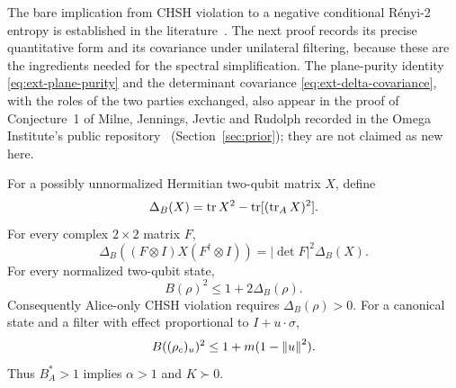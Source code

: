 The bare implication from CHSH violation to a negative conditional
R\'enyi-2 entropy is established in the literature~\cite{horodecki1996}.
The next proof records its precise quantitative form and its covariance
under unilateral filtering, because these are the ingredients needed for
the spectral simplification. The plane-purity identity
\eqref{eq:ext-plane-purity} and the determinant covariance
\eqref{eq:ext-delta-covariance}, with the roles of the two parties
exchanged, also appear in the proof of Conjecture~1 of Milne, Jennings,
Jevtic and Rudolph recorded in the Omega Institute's public
repository~\cite{dossier} (Section~\ref{sec:prior}); they are not claimed
as new here.

\begin{proposition}
\label{prop:ext-purity}
For a possibly unnormalized Hermitian two-qubit matrix $X$, define
\[
 \Delta_B(X)=\operatorname{tr} X^2-\operatorname{tr}[(\operatorname{tr}_A X)^2].
\]
For every complex $2\times2$ matrix $F$,
\begin{equation}
 \Delta_B((F\otimes I)X(F^\dagger\otimes I))
 =|\det F|^2\Delta_B(X).
 \label{eq:ext-delta-covariance}
\end{equation}
For every normalized two-qubit state,
\begin{equation}
 B(\rho)^2\le1+2\Delta_B(\rho).
 \label{eq:ext-purity-bound}
\end{equation}
Consequently Alice-only CHSH violation requires $\Delta_B(\rho)>0$.
For a canonical state and a filter with effect proportional to
$I+u\cdot\sigma$,
\begin{equation}
 B((\rho_c)_u)^2\le1+m(1-\left\lVert u\right\rVert^2).
 \label{eq:ext-filter-purity}
\end{equation}
Thus $B_A^*>1$ implies $\alpha>1$ and $K\succ0$.
\end{proposition}

